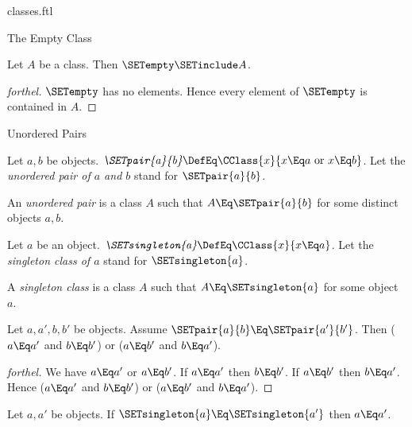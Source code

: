 \documentclass{stex}
\begin{document}
\begin{smodule}{classes.ftl}
\begin{sfragment}{The Empty Class}
  \begin{corollary}[forthel]
    Let $A$ be a class.
    Then $\SETempty \SETinclude A$.
  \end{corollary}
  \begin{proof}[forthel]
    $\SETempty$ has no elements.
    Hence every element of $\SETempty$ is contained in $A$.
  \end{proof}
\end{sfragment}

\begin{sfragment}{Unordered Pairs}
  \begin{definition}[forthel,for={SETpair,unordered pair}]
    Let $a, b$ be objects.
    $\emph{\SETpair{a}{b}} \DefEq \CClass{x}{x \Eq a\text{ or }x \Eq b}$.
    Let the \emph{unordered pair of $a$ and $b$} stand for $\SETpair{a}{b}$.
  \end{definition}

  \begin{definition}[forthel,for=unordered pair]
    An \emph{unordered pair} is a class $A$ such that $A \Eq \SETpair{a}{b}$ for some distinct objects $a, b$.
  \end{definition}

  \begin{definition}[forthel,for={SETsingleton,singleton class}]
    Let $a$ be an object.
    $\emph{\SETsingleton{a}} \DefEq \CClass{x}{x \Eq a}$.
    Let the \emph{singleton class of $a$} stand for $\SETsingleton{a}$.
  \end{definition}

  \begin{definition}[forthel,for=singleton class]
    A \emph{singleton class} is a class $A$ such that $A \Eq \SETsingleton{a}$ for some object $a$.
  \end{definition}

  \begin{proposition}[forthel]
    Let $a, a', b, b'$ be objects.
    Assume $\SETpair{a}{b} \Eq \SETpair{a'}{b'}$.
    Then ($a \Eq a'$ and $b \Eq b'$) or ($a \Eq b'$ and $b \Eq a'$).
  \end{proposition}
  \begin{proof}[forthel]
    We have $a \Eq a'$ or $a \Eq b'$.
    If $a \Eq a'$ then $b \Eq b'$.
    If $a \Eq b'$ then $b \Eq a'$.
    Hence ($a \Eq a'$ and $b \Eq b'$) or ($a \Eq b'$ and $b \Eq a'$).
  \end{proof}

  \begin{corollary}[forthel]
    Let $a, a'$ be objects.
    If $\SETsingleton{a} \Eq \SETsingleton{a'}$ then $a \Eq a'$.
  \end{corollary}


\end{sfragment}
\end{smodule}
\end{document}
